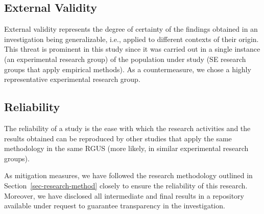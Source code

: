 \subsection{External Validity}
External validity represents the degree of certainty of the findings obtained in an investigation being generalizable, i.e., applied to different contexts of their origin. This threat is prominent in this study since it was carried out in a single instance (an experimental research group) of the population under study (SE research groups that apply empirical methods). As a countermeasure, we chose a highly representative experimental research group.

\subsection{Reliability}
The reliability of a study is the ease with which the research activities and the results obtained can be reproduced by other studies that apply the same methodology in the same RGUS (more likely, in similar experimental research groups). 

As mitigation measures, we have followed the research methodology outlined in Section~\ref{sec-research-method} closely to ensure the reliability of this research. Moreover, we have disclosed all intermediate and final results in a repository available under request to guarantee transparency in the investigation.